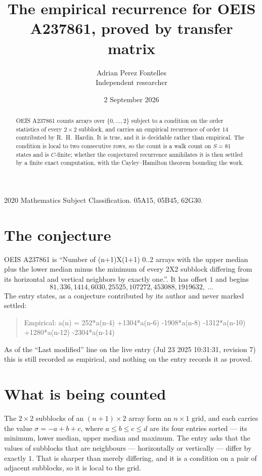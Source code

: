 \documentclass[11pt,a4paper]{article}
\title{The empirical recurrence for OEIS A237861, proved by transfer matrix}
\author{Adrian Perez Fontelles\\ \small Independent researcher}
\date{2 September 2026}
\theoremstyle{plain}
\theoremstyle{definition}
\begin{document}
\maketitle

\begin{abstract}
OEIS A237861 counts arrays over $\{0,\dots,2\}$ subject to a condition on the order
statistics of every $2\times2$ subblock, and carries an empirical recurrence of order
$14$ contributed by R.~H.~Hardin. It is true, and it is decidable rather than empirical.
The condition is local to two consecutive rows, so the count is a walk count on $S=81$
states and is $C$-finite; whether the conjectured recurrence annihilates it is then settled by
a finite exact computation, with the Cayley--Hamilton theorem bounding the work.
\end{abstract}

\noindent\small 2020 Mathematics Subject Classification. 05A15, 05B45, 62G30.\normalsize

\section{The conjecture}

OEIS A237861 is ``Number of (n+1)X(1+1) 0..2 arrays with the upper median plus the lower median minus the minimum of every 2X2 subblock differing from its horizontal and vertical neighbors by exactly one.''. It has offset $1$ and begins
\[
81, 336, 1414, 6030, 25525, 107272, 453088, 1919632,\ \dots
\]
The entry states, as a conjecture contributed by its author and never marked settled:
\begin{quote}
Empirical: a(n) = 252*a(n-4) +1304*a(n-6) -1908*a(n-8) -1312*a(n-10) +1280*a(n-12) -2304*a(n-14)
\end{quote}
As of the ``Last modified'' line on the live entry (Jul 23 2025 10:31:31, revision 7) this is still
recorded as empirical, and nothing on the entry records it as proved.

\section{What is being counted}

The $2\times2$ subblocks of an $(n+1)\times2$ array form an
$n\times1$ grid, and each carries the value $\sigma=-a+b+c$, where $a\le b\le c\le d$ are its four entries sorted --- its minimum, lower median, upper median and maximum. The entry asks that the values of
subblocks that are neighbours --- horizontally or vertically --- differ by exactly $1$.
That is sharper than merely differing, and it is a condition on a pair of adjacent subblocks,
so it is local to the grid.
\end{document}
